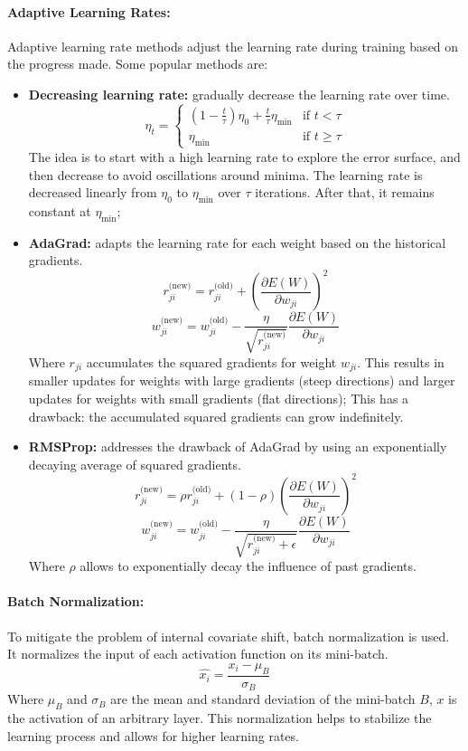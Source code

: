 \paragraph{Adaptive Learning Rates:}
Adaptive learning rate methods adjust the learning rate during training based on the progress made.
Some popular methods are:
\begin{itemize}
    \item \textbf{Decreasing learning rate:} gradually decrease the learning rate over time.
    \[\eta_t = \begin{cases}
    (1 - \frac{t}{\tau})\eta_0 + \frac{t}{\tau} \eta_{\text{min}}  & \text{if } t < \tau \\
    \eta_{\text{min}} & \text{if } t \ge \tau
    \end{cases}
    \]
    The idea is to start with a high learning rate to explore the error surface, and then decrease to avoid oscillations around minima.
    The learning rate is decreased linearly from $\eta_0$ to $\eta_{\text{min}}$ over $\tau$ iterations. After that, it remains constant at $\eta_{\text{min}}$;
    \item \textbf{AdaGrad:} adapts the learning rate for each weight based on the historical gradients.
    \[ r_{ji}^\text{(new)} = r_{ji}^\text{(old)} + \left(\frac{\partial E(W)}{\partial w_{ji}}\right)^2 \]
    \[ w_{ji}^\text{(new)} = w_{ji}^\text{(old)} - \frac{\eta}{\sqrt{r_{ji}^\text{(new)}}} \frac{\partial E(W)}{\partial w_{ji}} \]
    Where $r_{ji}$ accumulates the squared gradients for weight $w_{ji}$. This results in smaller updates for weights with large gradients (steep directions) and larger updates for weights with small gradients (flat directions);
    This has a drawback: the accumulated squared gradients can grow indefinitely.
    \item \textbf{RMSProp:} addresses the drawback of AdaGrad by using an exponentially decaying average of squared gradients.
    \[ r_{ji}^\text{(new)} = \rho r_{ji}^\text{(old)} + (1 - \rho) \left(\frac{\partial E(W)}{\partial w_{ji}}\right)^2 \]
    \[ w_{ji}^\text{(new)} = w_{ji}^\text{(old)} - \frac{\eta}{\sqrt{r_{ji}^\text{(new)} + \epsilon}} \frac{\partial E(W)}{\partial w_{ji}} \]
    Where $\rho$ allows to exponentially decay the influence of past gradients.
\end{itemize}
\paragraph{Batch Normalization:}
To mitigate the problem of internal covariate shift, batch normalization is used. It normalizes the input of each activation function on its mini-batch.
\[ \hat{x_i} = \frac{x_i - \mu_B}{\sigma_B}\]
Where $\mu_B$ and $\sigma_B$ are the mean and standard deviation of the mini-batch $B$, $x$ is the activation of an arbitrary layer.
This normalization helps to stabilize the learning process and allows for higher learning rates.
